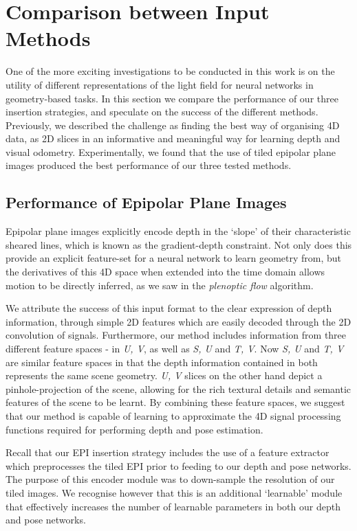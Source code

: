 \section{Comparison between Input Methods}
One of the more exciting investigations to be conducted in this work is on the utility of different representations of the light field for neural networks in geometry-based tasks. In this section we compare the performance of our three insertion strategies, and speculate on the success of the different methods. Previously, we described the challenge as finding the best way of organising 4D data, as 2D slices in an informative and meaningful way for learning depth and visual odometry. Experimentally, we found that the use of tiled epipolar plane images produced the best performance of our three tested methods.

\subsection{Performance of Epipolar Plane  Images}

Epipolar plane images explicitly encode depth in the `slope' of their characteristic sheared lines, which is known as the gradient-depth constraint. Not only does this provide an explicit feature-set for a neural network to learn geometry from, but the derivatives of this 4D space when extended into the time domain allows motion to be directly inferred, as we saw in the \textit{plenoptic flow} algorithm.

We attribute the success of this input format to the clear expression of depth information, through simple 2D features which are easily decoded through the 2D convolution of signals. Furthermore, our method includes information from three different feature spaces - in \textit{U, V}, as well as \textit{S, U} and \textit{T, V}. Now \textit{S, U} and \textit{T, V} are similar feature spaces in that the depth information contained in both represents the same scene geometry. \textit{U, V} slices on the other hand depict a pinhole-projection of the scene, allowing for the rich textural details and semantic features of the scene to be learnt. By combining these feature spaces, we suggest that our method is capable of learning to approximate the 4D signal processing functions required for performing depth and pose estimation.

Recall that our EPI insertion strategy includes the use of a feature extractor which preprocesses the tiled EPI prior to feeding to our depth and pose networks. The purpose of this encoder module was to down-sample the resolution of our tiled images. We recognise however that this is an additional `learnable' module that effectively increases the number of learnable parameters in both our depth and pose networks. 


